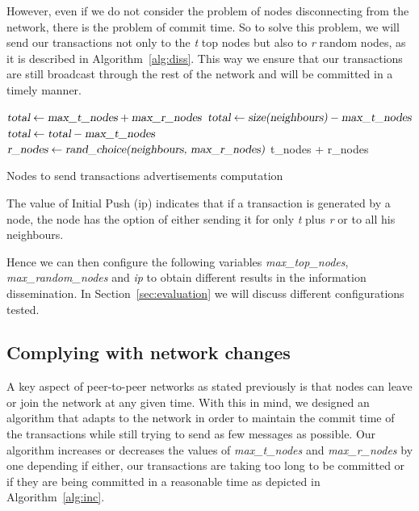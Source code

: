 \documentclass{dads}   %
\begin{document}
However, even if we do not consider the problem of nodes disconnecting from the network, there is the problem of commit time. So to solve this problem, we will send our transactions not only to the \textit{t} top nodes but also to \textit{r} random nodes, as it is described in Algorithm~\ref{alg:diss}. This way we ensure that our transactions are still broadcast through the rest of the network and will be committed in a timely manner.

\begin{algorithm}[t]
\begin{algorithmic}[1]
\EndIf
\State $\textsl{total} \gets \textsl{max\_t\_nodes} + \textsl{max\_r\_nodes}$
	\State $\textsl{total} \gets \textsl{size(neighbours)} - \textsl{max\_t\_nodes}$
\Else
	\State $\textsl{total} \gets \textsl{total} - \textsl{max\_t\_nodes}$
    \EndIf
{}
	\State $\textsl{r\_nodes} \gets \textsl{rand\_choice(neighbours, max\_r\_nodes)}$
    \EndIf
\State \Return t\_nodes + r\_nodes
\EndFunction
\end{algorithmic}
\caption{Nodes to send transactions advertisements computation}
\label{alg:diss}
\end{algorithm}

The value of Initial Push (ip) indicates that if a transaction is generated by a node, the node has the option of either sending it for only \textit{t} plus \textit{r} or to all his neighbours.

Hence we can then configure the following variables \textsl{max\_top\_nodes}, \textsl{max\_random\_nodes} and \textsl{ip} to obtain different results in the information dissemination. In Section~\ref{sec:evaluation} we will discuss different configurations tested.

\subsection{Complying with network changes}
\label{sec:nc}
A key aspect of peer-to-peer networks as stated previously is that nodes can leave or join the network at any given time. With this in mind, we designed an algorithm that adapts to the network in order to maintain the commit time of the transactions while still trying to send as few messages as possible. Our algorithm increases or decreases the values of \textsl{max\_t\_nodes} and \textsl{max\_r\_nodes} by one depending if either, our transactions are taking too long to be committed or if they are being committed in a reasonable time as depicted in Algorithm~\ref{alg:inc}.
\end{document}
